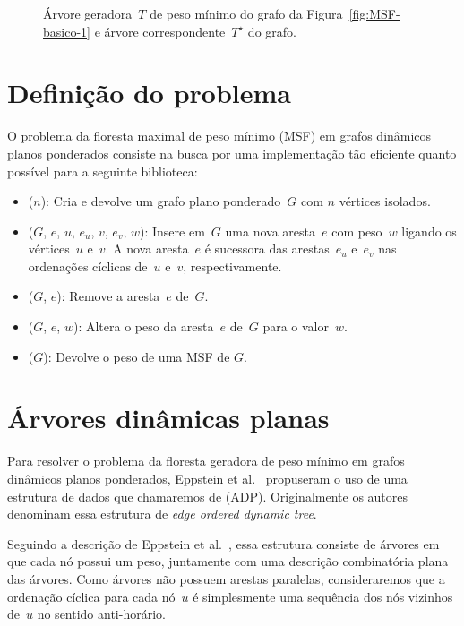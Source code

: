 \begin{figure}[htb]
\scalebox{1.5}{
\centering

}
\caption{Árvore geradora~$T$ de peso mínimo do grafo da Figura~\ref{fig:MSF-basico-1} e árvore correspondente~$T^\star$ do grafo.}
\label{fig:MSF-figura-2}
\end{figure}





\section{Definição do problema}
\label{sec:definition-MSF}
O problema da floresta maximal de peso mínimo (MSF) em grafos dinâmicos planos ponderados consiste na busca por uma implementação tão eficiente quanto possível para a seguinte biblioteca:

\begin{itemize}
\item \MSFCreate($n$): Cria e devolve um grafo plano ponderado~$G$ com $n$ vértices isolados.
\item \MSFaddEdge($G$, $e$, $u$, $e_u$, $v$, $e_v$, $w$): Insere em~$G$ uma nova aresta~$e$ com peso~$w$ ligando os vértices~$u$ e~$v$. A nova aresta~$e$ é sucessora das arestas~$e_u$ e~$e_v$ nas ordenações cíclicas de~$u$ e~$v$, respectivamente.
\item \MSFdelEdge($G$, $e$): Remove a aresta~$e$ de~$G$.
\item \MSFupdate($G$, $e$, $w$): Altera o peso da aresta~$e$ de~$G$ para o valor~$w$.
\item \MSFweight($G$): Devolve o peso de uma MSF de $G$.
\end{itemize}


\section{Árvores dinâmicas planas}
\label{sec:EODT}

Para resolver o problema da floresta geradora de peso mínimo em grafos dinâmicos planos ponderados, Eppstein et al.~\cite{EPPSTEIN-planar} propuseram o uso de uma estrutura de dados que chamaremos de  (ADP). Originalmente os autores denominam essa estrutura de \textit{edge ordered dynamic tree}.

Seguindo a descrição de Eppstein et al.~\cite[Seção 3]{EPPSTEIN-planar}, essa estrutura consiste de árvores em que cada nó possui um peso, juntamente com uma descrição combinatória plana das árvores.
Como árvores não possuem arestas paralelas, consideraremos que a ordenação cíclica para cada nó~$u$ é simplesmente uma sequência dos nós vizinhos de~$u$ no sentido anti-horário.

